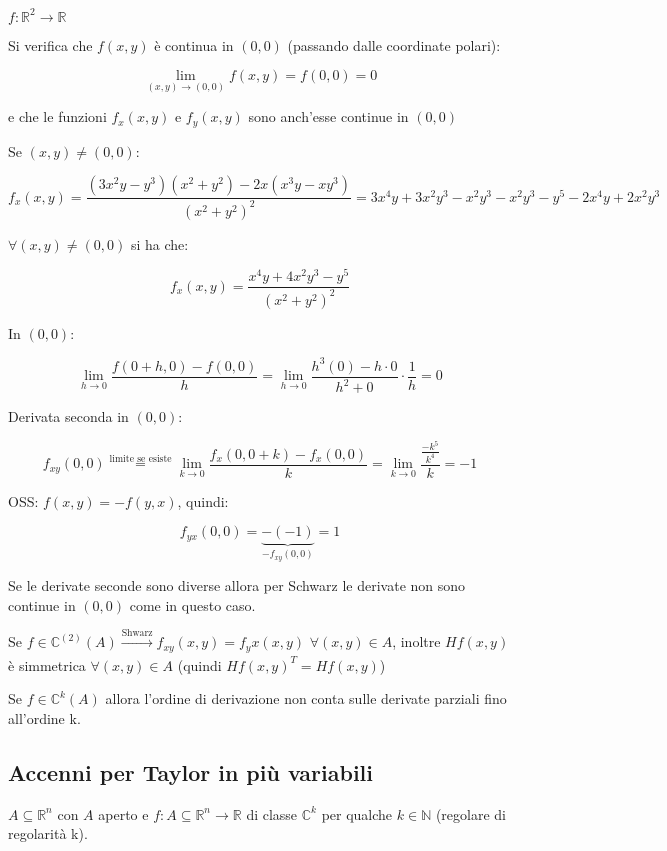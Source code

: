 \documentclass[../appunti-analisi.tex]{subfiles}
\begin{document}
$f: \mathbb{R}^{2} \rightarrow \mathbb{R}$ 

Si verifica che $f(x,y)$ è continua in $(0,0)$ (passando dalle coordinate polari):

\[
    \lim_{ (x,y) \to (0,0) } f(x,y)=f(0,0) = 0
\]

e che le funzioni $f_x(x,y)$ e $f_y(x,y)$ sono anch'esse continue in $(0,0)$

Se $(x,y) \neq (0,0)$:

\[
    f_x(x,y) = \frac{(3x^{2}y-y^{3})(x^{2}+y^{2})-2x(x^{3}y-xy^{3})}{(x^{2}+y^{2})^{2}} = 3x^{4}y+3x^{2}y^{3}-x^{2}y^{3}-x^{2}y^{3}-y^{5}-2x^{4}y+2x^{2}y^{3} 
\]


$\forall (x,y) \neq (0,0)$ si ha che:

\[
f_x(x,y) = \frac{x^{4}y+4x^{2}y^{3}-y^{5}}{(x^{2}+y^{2})^{2}}
\]


In $(0,0)$:

\[
    \lim_{ h \to 0 } \frac{f(0+h,0) - f(0,0)}{h} = \lim_{ h \to 0 } \frac{h^{3}(0) - h\cdot 0}{h^{2}+0} \cdot  \frac{1}{h} = 0
\]


Derivata seconda in $(0,0)$:

\[
    f_{xy} (0,0) \overset{\text{limite se esiste}}{=} \lim_{ k \to 0 } \frac{f_x(0,0+k) - f_x(0,0)}{k} = \lim_{ k \to 0 } \frac{ \frac{-k^{5}}{k^{4}}}{k} = -1
\]

OSS: $f(x,y)=-f(y,x)$, quindi:

\[
    f_{yx}(0,0) = \underbrace{-(-1)}_\text{$-f_{xy}(0,0)$} = 1
\]

Se le derivate seconde sono diverse allora per Schwarz le derivate non sono continue in $(0,0)$ come in questo caso.



Se $f \in \mathbb{C}^{(2)} (A) \xrightarrow[]{\text{Shwarz}} f_{xy}(x,y) = f_yx(x,y)$ $\forall (x,y) \in A$, inoltre $H f(x,y)$ è simmetrica $\forall (x,y) \in A$ (quindi $Hf(x,y)^{T}=Hf(x,y)$)

Se $f \in \mathbb{C}^{k}(A)$ allora l'ordine di derivazione non conta sulle derivate parziali fino all'ordine k.

\subsection{Accenni per Taylor in più variabili}

$A \subseteq \mathbb{R}^{n}$ con $A$ aperto e $f:A \subseteq \mathbb{R}^{n} \rightarrow \mathbb{R}$ di classe $\mathbb{C}^{k}$ per qualche $k \in \mathbb{N}$ (regolare di regolarità k).
\end{document}
